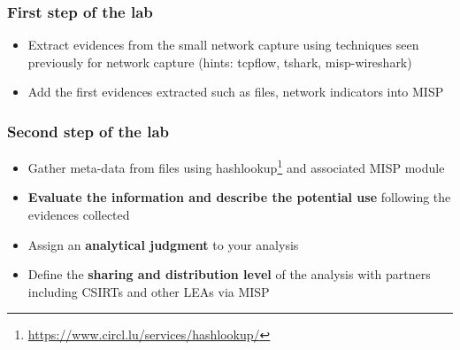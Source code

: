 \begin{frame}
    \frametitle{First step of the lab}
    \begin{itemize}
        \item Extract evidences from the small network capture using techniques seen previously for network capture (hints: tcpflow, tshark, misp-wireshark)
        \item Add the first evidences extracted such as files, network indicators into MISP
    \end{itemize}
\end{frame}

\begin{frame}
    \frametitle{Second step of the lab}
    \begin{itemize}
        \item Gather meta-data from files using hashlookup\footnote{\url{https://www.circl.lu/services/hashlookup/}} and associated MISP module
        \item {\bf Evaluate the information and describe the potential use} following the evidences collected
        \item Assign an {\bf analytical judgment} to your analysis
        \item Define the {\bf sharing and distribution level} of the analysis with partners including CSIRTs and other LEAs via MISP
    \end{itemize}
\end{frame}

